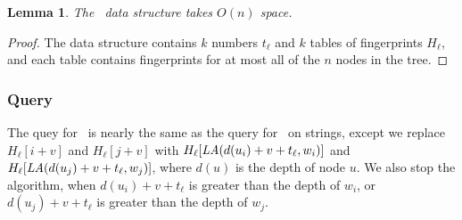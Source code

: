 \documentclass[a4]{article}
\newtheorem{lemma}{Lemma}
\begin{document}
\begin{lemma}
The \tfprintk\ data structure takes $O(n)$ space.
\end{lemma}
\begin{proof}
The data structure contains $k$ numbers $t_\ell$ and $k$ tables of fingerprints $H_\ell$, and each table contains fingerprints for at most all of the $n$ nodes in the tree.
\end{proof}

\subsubsection{Query}

The quey for \tfprintk\ is nearly the same as the query for \fprintk\ on strings, except we replace $H_\ell[i+v]$ and $H_\ell[j+v]$ with $H_\ell[\textit{LA}(d(u_i)+v+t_\ell,w_i)]$ and $H_\ell[\textit{LA}(d(u_j)+v+t_\ell,w_j)]$, where $d(u)$ is the depth of node $u$. We also stop the algorithm, when $d(u_i)+v+t_\ell$ is greater than the depth of $w_i$, or $d(u_j)+v+t_\ell$ is greater than the depth of $w_j$.
\end{document}
